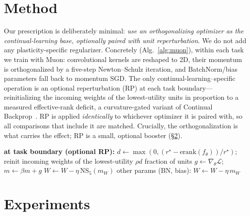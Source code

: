 \documentclass[letterpaper]{article} %
\begin{document}
\section{Method}\label{sec:method}
Our prescription is deliberately minimal: \emph{use an orthogonalizing optimizer as the continual-learning base, optionally paired with unit reperturbation}. We do not add any plasticity-specific regularizer. Concretely (Alg.~\ref{alg:muon}), within each task we train with Muon: convolutional kernels are reshaped to 2D, their momentum is orthogonalized by a five-step Newton--Schulz iteration, and BatchNorm/bias parameters fall back to momentum SGD. The only continual-learning--specific operation is an optional reperturbation (RP) at each task boundary---reinitializing the incoming weights of the lowest-utility units in proportion to a measured effective-rank deficit, a curvature-gated variant of Continual Backprop~\citep{dohare2024}. RP is applied \emph{identically} to whichever optimizer it is paired with, so all comparisons that include it are matched. Crucially, the orthogonalization is what carries the effect; RP is a small, optional booster (\S\ref{sec:exp}).

\begin{algorithm}[t]
\caption{Muon base for continual plasticity (one task)}\label{alg:muon}
\begin{algorithmic}[1]
\STATE \textbf{at task boundary (optional RP):} $d\!\leftarrow\!\max(0,(r^\star-\mathrm{erank}(f_\theta))/r^\star)$; reinit incoming weights of the lowest-utility $\rho d$ fraction of units
  \STATE $g\leftarrow\nabla_\theta\mathcal{L}$;\quad $m\leftarrow\beta m+g$
    \STATE $W\leftarrow W-\eta\,\mathrm{NS}_5(m_W)$ 
  \ENDFOR
  \STATE other params (BN, bias): $W\leftarrow W-\eta\,m_W$
\ENDFOR
\end{algorithmic}
\end{algorithm}

\section{Experiments}\label{sec:exp}
\end{document}
